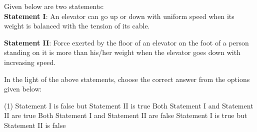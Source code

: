 \item Given below are two statements:\\
\textbf{Statement I}: An elevator can go up or down with uniform speed when its weight is balanced with the tension of its cable.

\textbf{Statement II}: Force exerted by the floor of an elevator on the foot of a person standing on it is more than his/her weight when the elevator goes down with increasing speed.

In the light of the above statements, choose the correct answer from the options given below:
\begin{tasks}(1)
    \task Statement I is false but Statement II is true
    \task Both Statement I and Statement II are true
    \task Both Statement I and Statement II are false
    \task Statement I is true but Statement II is false
\end{tasks}